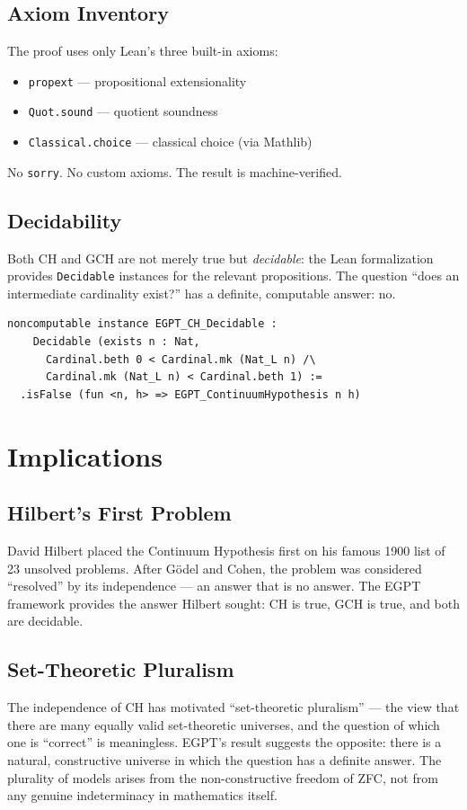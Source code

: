 \documentclass{report}
\begin{document}
\subsection{Axiom Inventory}

The proof uses only Lean's three built-in axioms:
\begin{itemize}
\item \texttt{propext} --- propositional extensionality
\item \texttt{Quot.sound} --- quotient soundness
\item \texttt{Classical.choice} --- classical choice (via Mathlib)
\end{itemize}

No \texttt{sorry}. No custom axioms. The result is machine-verified.

\subsection{Decidability}

Both CH and GCH are not merely true but \emph{decidable}: the Lean formalization
provides \texttt{Decidable} instances for the relevant propositions. The question
``does an intermediate cardinality exist?'' has a definite, computable answer: no.

\begin{lstlisting}[style=leanstyle, caption={Decidability of CH in Lean 4}]
noncomputable instance EGPT_CH_Decidable :
    Decidable (exists n : Nat,
      Cardinal.beth 0 < Cardinal.mk (Nat_L n) /\
      Cardinal.mk (Nat_L n) < Cardinal.beth 1) :=
  .isFalse (fun <n, h> => EGPT_ContinuumHypothesis n h)
\end{lstlisting}

\section{Implications}

\subsection{Hilbert's First Problem}
David Hilbert placed the Continuum Hypothesis first on his famous 1900 list of
23 unsolved problems. After G\"odel and Cohen, the problem was considered
``resolved'' by its independence --- an answer that is no answer. The EGPT
framework provides the answer Hilbert sought: CH is true, GCH is true, and
both are decidable.

\subsection{Set-Theoretic Pluralism}
The independence of CH has motivated ``set-theoretic pluralism'' --- the view
that there are many equally valid set-theoretic universes, and the question of
which one is ``correct'' is meaningless. EGPT's result suggests the opposite:
there is a natural, constructive universe in which the question has a definite
answer. The plurality of models arises from the non-constructive freedom of
ZFC, not from any genuine indeterminacy in mathematics itself.
\end{document}
